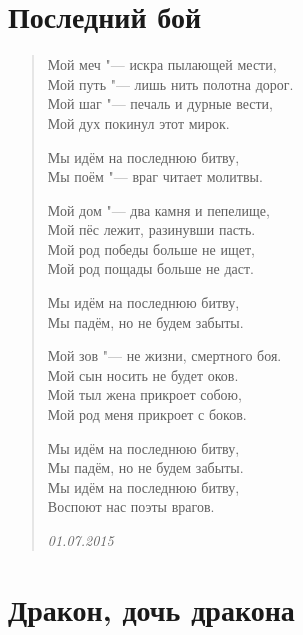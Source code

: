 \documentclass[a4paper,12pt]{article}
\begin{document}
\section{Последний бой}

\begin{verse}
Мой меч "--- искра пылающей мести,\\
Мой путь "--- лишь нить полотна дорог.\\
Мой шаг "--- печаль и дурные вести,\\
Мой дух покинул этот мирок.

Мы идём на последнюю битву,\\
Мы поём "--- враг читает молитвы.

Мой дом "--- два камня и пепелище,\\
Мой пёс лежит, разинувши пасть.\\
Мой род победы больше не ищет,\\
Мой род пощады больше не даст.

Мы идём на последнюю битву,\\
Мы падём, но не будем забыты.

Мой зов "--- не жизни, смертного боя.\\
Мой сын носить не будет оков.\\
Мой тыл жена прикроет собою,\\
Мой род меня прикроет с боков.

Мы идём на последнюю битву,\\
Мы падём, но не будем забыты.\\
Мы идём на последнюю битву,\\
Воспоют нас поэты врагов.

\emph{01.07.2015}
\end{verse} 
\newpage

\section{Дракон, дочь дракона}
\end{document}
